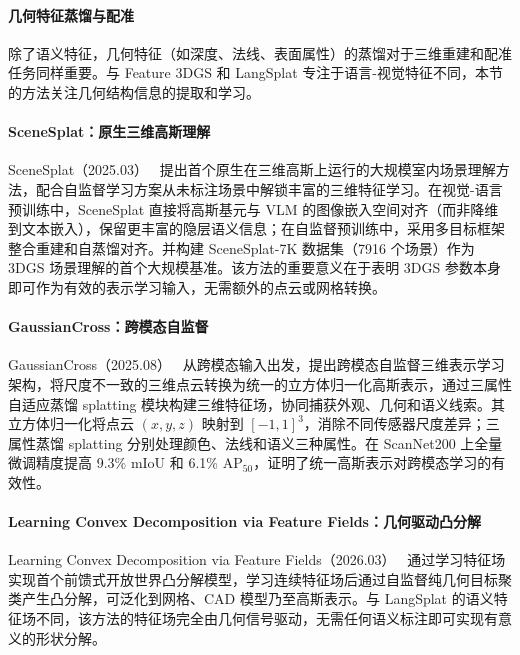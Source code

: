 \paragraph{几何特征蒸馏与配准}

除了语义特征，几何特征（如深度、法线、表面属性）的蒸馏对于三维重建和配准任务同样重要。与 Feature 3DGS 和 LangSplat 专注于语言-视觉特征不同，本节的方法关注几何结构信息的提取和学习。

\paragraph{SceneSplat：原生三维高斯理解} SceneSplat（2025.03）~\cite{2503_18052} 提出首个原生在三维高斯上运行的大规模室内场景理解方法，配合自监督学习方案从未标注场景中解锁丰富的三维特征学习。在视觉-语言预训练中，SceneSplat 直接将高斯基元与 VLM 的图像嵌入空间对齐（而非降维到文本嵌入），保留更丰富的隐层语义信息；在自监督预训练中，采用多目标框架整合重建和自蒸馏对齐。并构建 SceneSplat-7K 数据集（7916 个场景）作为 3DGS 场景理解的首个大规模基准。该方法的重要意义在于表明 3DGS 参数本身即可作为有效的表示学习输入，无需额外的点云或网格转换。

\paragraph{GaussianCross：跨模态自监督} GaussianCross（2025.08）~\cite{2508_02172} 从跨模态输入出发，提出跨模态自监督三维表示学习架构，将尺度不一致的三维点云转换为统一的立方体归一化高斯表示，通过三属性自适应蒸馏 splatting 模块构建三维特征场，协同捕获外观、几何和语义线索。其立方体归一化将点云 $(x, y, z)$ 映射到 $[-1, 1]^3$，消除不同传感器尺度差异；三属性蒸馏 splatting 分别处理颜色、法线和语义三种属性。在 ScanNet200 上全量微调精度提高 9.3\% mIoU 和 6.1\% AP$_{50}$，证明了统一高斯表示对跨模态学习的有效性。

\paragraph{Learning Convex Decomposition via Feature Fields：几何驱动凸分解} Learning Convex Decomposition via Feature Fields（2026.03）~\cite{2603_09285} 通过学习特征场实现首个前馈式开放世界凸分解模型，学习连续特征场后通过自监督纯几何目标聚类产生凸分解，可泛化到网格、CAD 模型乃至高斯表示。与 LangSplat 的语义特征场不同，该方法的特征场完全由几何信号驱动，无需任何语义标注即可实现有意义的形状分解。

